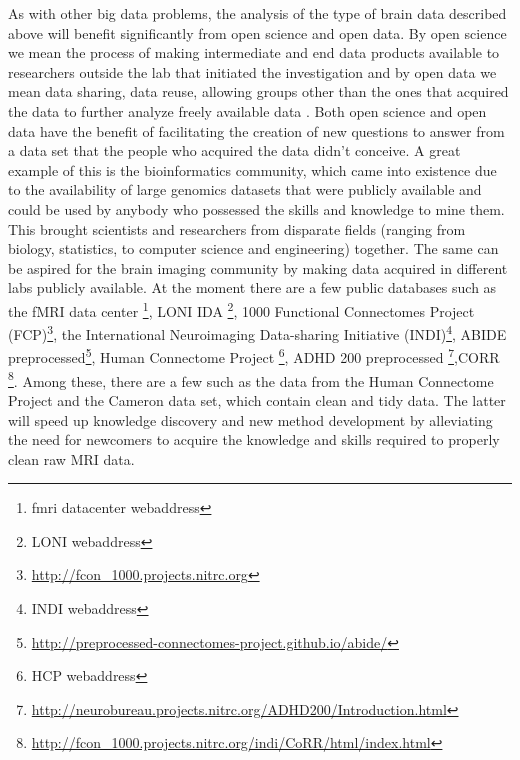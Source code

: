 As with other big data problems, the analysis of the type of brain data described above will benefit significantly from open science and open data. By open science we mean the process of making intermediate and end data products available to researchers outside the lab that initiated the investigation and by open data we mean data sharing, data reuse, allowing groups other than the ones that acquired the data to further analyze freely available data \cite{Milham2012}. Both open science and open data have the benefit of facilitating the creation of new questions to answer from a data set that the people who acquired the data didn't conceive. A great example of this is the bioinformatics community, which came into existence due to the availability of large genomics datasets that were publicly available and could be used by anybody who possessed the skills and knowledge to mine them\cite{VanHorn2013}. This brought scientists and researchers from disparate fields (ranging from biology, statistics, to computer science and engineering) together. The same can be aspired for the brain imaging community by making data acquired in different labs publicly available. At the moment there are a few public databases such as the fMRI data center \footnote{fmri datacenter webaddress}, LONI IDA \footnote{LONI webaddress}, 1000 Functional Connectomes Project (FCP)\footnote{\url{http://fcon_1000.projects.nitrc.org}}, the International Neuroimaging Data-sharing Initiative (INDI)\footnote{INDI webaddress}, ABIDE preprocessed\footnote{\url{http://preprocessed-connectomes-project.github.io/abide/}}, Human Connectome Project \footnote{HCP webaddress}, ADHD 200 preprocessed \footnote{\url{http://neurobureau.projects.nitrc.org/ADHD200/Introduction.html}},CORR \footnote{\url{http://fcon_1000.projects.nitrc.org/indi/CoRR/html/index.html}}. Among these, there are a few such as the data from the Human Connectome Project and the Cameron data set, which contain clean and tidy data. The latter will speed up knowledge discovery and new method development by alleviating the need for newcomers to acquire the knowledge and skills required to properly clean raw MRI data. 
